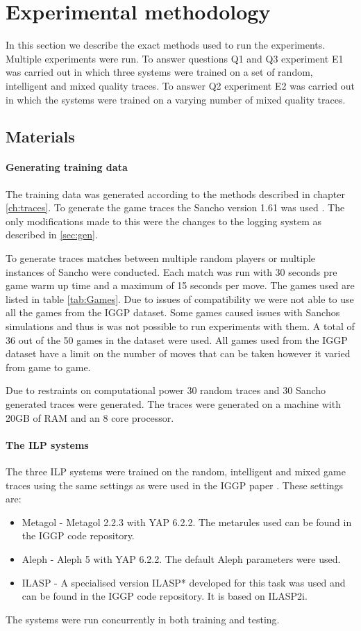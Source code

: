 \chapter{Experimental methodology}\label{ch:methodology}

In this section we describe the exact methods used to run the experiments. Multiple experiments were run. To answer questions Q1 and Q3 experiment E1 was carried out in which three systems were trained on a set of random, intelligent and mixed quality traces. To answer Q2 experiment E2 was carried out in which the systems were trained on a varying number of mixed quality traces.
\section{Materials}
\subsubsection{Generating training data}
The training data was generated according to the methods described in chapter \ref{ch:traces}. To generate the game traces the Sancho version 1.61 was used \cite{Sancho/Github}. The only modifications made to this were the changes to the logging system as described in \ref{sec:gen}.

To generate traces matches between multiple random players or multiple instances of Sancho were conducted. Each match was run with 30 seconds pre game warm up time and a maximum of 15 seconds per move. The games used are listed in table \ref{tab:Games}. Due to issues of compatibility we were not able to use all the games from the IGGP dataset. Some games caused issues with Sanchos simulations and thus is was not possible to run experiments with them. A total of 36 out of the 50 games in the dataset were used. All games used from the IGGP dataset have a limit on the number of moves that can be taken however it varied from game to game.

Due to restraints on computational power 30 random traces and 30 Sancho generated traces were generated. The traces were generated on a machine with 20GB of RAM and an 8 core processor. 

\subsubsection{The ILP systems}

The three ILP systems were trained on the random, intelligent and mixed game traces using the same settings as were used in the IGGP paper \cite{Cropper/IGGP}. These settings are:
\begin{itemize}
	\item Metagol - Metagol 2.2.3 with YAP 6.2.2. The metarules used can be found in the IGGP code repository.
	\item Aleph - Aleph 5 with YAP 6.2.2. The default Aleph parameters were used.
	\item ILASP - A specialised version ILASP* developed for this task was used and can be found in the IGGP code repository. It is based on ILASP2i.
\end{itemize}
The systems were run concurrently in both training and testing.


